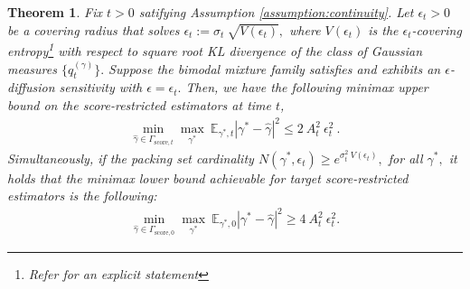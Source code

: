 \documentclass[11pt]{article}
\theoremstyle{plain}
\newtheorem{theorem}{Theorem}[section]
\newcommand{\1}{\mathbbm{1}}
\newcommand{\qdist}[2][]{q_{#1}^{(#2)}}
\begin{document}
\begin{theorem}
\label{thm:sensitivity}
Fix $t>0$ satifying Assumption \ref{assumption:continuity}. Let $\epsilon_{t} > 0$ be a covering radius that solves $\epsilon_{t}:= \sigma_t\: \sqrt{V(\epsilon_{t})},$ where $V(\epsilon_{t})$ is the $\epsilon_{t}$-covering entropy\footnote{Refer  for an explicit statement} with respect to square root KL divergence of the class of Gaussian measures $\{\qdist[t]{\gamma}\}.$ 
     Suppose the bimodal mixture family satisfies  and exhibits an $\epsilon$-diffusion sensitivity with $\epsilon = \epsilon_{t}.$
    Then, we have the following minimax upper bound on the score-restricted estimators at time $t$, 
    \begin{align}
        \min_{\hat{\gamma} \in \Gamma_{\mathrm{score},t}}\max_{\gamma^*}~
        \mathbb{E}_{\gamma^*,t} |\gamma^* - \hat{\gamma}|^2 \leq 2\:A_t^2\: \epsilon_{t}^2\: .
        \label{eq:upperBound}
    \end{align} 
Simultaneously, if the packing set cardinality $N(\gamma^*, \epsilon_{t}) \geq e^{\sigma_t^2\:V(\epsilon_{t})},$ for all $\gamma^*,$ it  holds that the minimax lower bound achievable for target score-restricted estimators is the following:
    \begin{align}
\label{eq:lowerBound}
\min_{\hat{\gamma} \in \Gamma_{\mathrm{score},0}}\max_{\gamma^*}~ \mathbb{E}_{\gamma^*,0} |\gamma^* - \hat{\gamma}|^2 \geq 4\: A_t^2\: \epsilon_{t}^2.
    \end{align}
\end{theorem}


\end{document}
